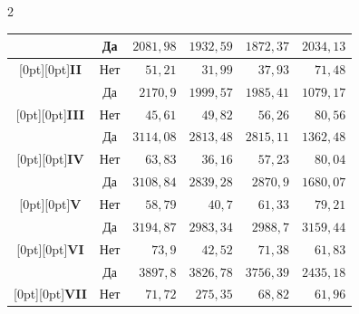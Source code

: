 \begin{multicols}{2}
\begin{table}[b]
\begin{center}
\begin{tabular}{|c|c|r|r|r|r|}
&Да&$2081{,}98$&$1932{,}59$&$1872{,}37$&$2034{,}13$\\

\hline

\multicolumn{1}{|c|}{\raisebox{-6pt}[0pt][0pt]{{\bf II}}}&Нет&$51{,}21$&$31{,}99$&$37{,}93$&$71{,}48$\\


&Да&$2170{,}9$\hphantom{9}&$1999{,}57$&$1985{,}41$&$1079{,}17$\\

\hline

\multicolumn{1}{|c|}{\raisebox{-6pt}[0pt][0pt]{{\bf III}}}&Нет&$45{,}61$&$49{,}82$&$56{,}26$&$80{,}56$\\


&Да&$3114{,}08$&$2813{,}48$&$2815{,}11$&$1362{,}48$\\

\hline

\multicolumn{1}{|c|}{\raisebox{-6pt}[0pt][0pt]{{\bf IV}}}&Нет&$63{,}83$&$36{,}16$&$57{,}23$&$80{,}04$\\


&Да&$3108{,}84$&$2839{,}28$&$2870{,}9$\hphantom{9}&$1680{,}07$\\

\hline

\multicolumn{1}{|c|}{\raisebox{-6pt}[0pt][0pt]{{\bf V}}}&

Нет&$58{,}79$&$40{,}7$\hphantom{9}&$61{,}33$&$79{,}21$\\


&Да&$3194{,}87$&$2983{,}34$&$2988{,}7$\hphantom{9}&$3159{,}44$\\

\hline

\multicolumn{1}{|c|}{\raisebox{-6pt}[0pt][0pt]{{\bf VI}}}&Нет&$73{,}9$\hphantom{9}&$42{,}52$&$71{,}38$&$61{,}83$\\


&Да&$3897{,}8$\hphantom{9}&$3826{,}78$&$3756{,}39$&$2435{,}18$\\

\hline

\multicolumn{1}{|c|}{\raisebox{-6pt}[0pt][0pt]{{\bf VII}}}&Нет&$71{,}72$&$275{,}35$&$68{,}82$&$61{,}96$\\



\end{tabular}
\end{center}
\end{table}
\end{multicols}
